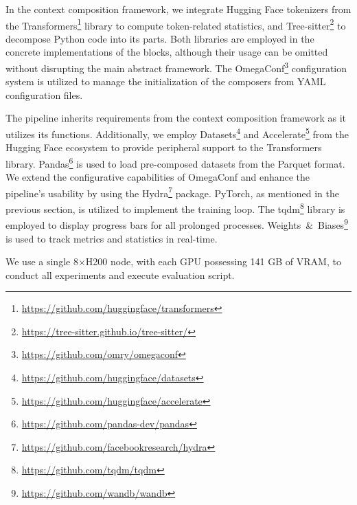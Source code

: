 In the context composition framework, we integrate Hugging Face tokenizers from the Transformers\footnote{\url{https://github.com/huggingface/transformers}} library to compute token-related statistics, and Tree-sitter\footnote{\url{https://tree-sitter.github.io/tree-sitter/}} to decompose Python code into its parts. Both libraries are employed in the concrete implementations of the blocks, although their usage can be omitted without disrupting the main abstract framework. The OmegaConf\footnote{\url{https://github.com/omry/omegaconf}} configuration system is utilized to manage the initialization of the composers from YAML configuration files.

The pipeline inherits requirements from the context composition framework as it utilizes its functions. Additionally, we employ Datasets\footnote{\url{https://github.com/huggingface/datasets}} and Accelerate\footnote{\url{https://github.com/huggingface/accelerate}} from the Hugging Face ecosystem to provide peripheral support to the Transformers library. Pandas\footnote{\url{https://github.com/pandas-dev/pandas}} is used to load pre-composed datasets from the Parquet format. We extend the configurative capabilities of OmegaConf and enhance the pipeline's usability by using the Hydra\footnote{\url{https://github.com/facebookresearch/hydra}} package. PyTorch, as mentioned in the previous section, is utilized to implement the training loop. The tqdm\footnote{\url{https://github.com/tqdm/tqdm}} library is employed to display progress bars for all prolonged processes. Weights~\&~Biases\footnote{\url{https://github.com/wandb/wandb}} is used to track metrics and statistics in real-time.

We use a single 8\(\times\)H200 node, with each GPU possessing 141 GB of VRAM, to conduct all experiments and execute evaluation script.
